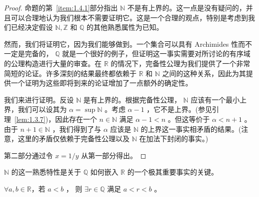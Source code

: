 \begin{proof}
命题的第~\ref{item:1.4.1}部分指出 \(\mathbb{N}\) 不是有上界的。这一点是没有疑问的，并且可以合理地认为我们根本不需要证明它。这是一个合理的观点，特别是考虑到我们已经决定假设 \(\mathbb{N},\mathbb{Z}\) 和 \(\mathbb{Q}\) 的其他熟悉属性为已知。

然而，我们将证明它，因为我们能够做到。一个集合可以具有 Archimides 性而不一定是完备的， \(\mathbb{Q}\) 就是一个很好的例子，但证明这一事实需要对所讨论的有序域的公理构造进行大量的审查。在 \(\mathbb{R}\) 的情况下，完备性公理为我们提供了一个非常简短的论证。许多深刻的结果最终都依赖于 \(\mathbb{R}\) 和 \(\mathbb{N}\) 之间的这种关系，因此为其提供一个证明为这些即将到来的论证增加了一点额外的确定性。

我们来进行证明。反设 \(\mathbb{N}\) 是有上界的。根据完备性公理， \(\mathbb{N}\) 应该有一个最小上界，我们可以设其为 \(\alpha  = \sup \mathbb{N}\) 。考虑 \(\alpha  - 1\) ，它不是上界。(参见引理~\ref{lem:1.3.7})，因此存在一个 \(n \in  \mathbb{N}\) 满足 \(\alpha  - 1 < n\) 。但这等价于 \(\alpha  < n + 1\) 。由于 \(n + 1 \in  \mathbb{N}\) ，我们得到了与 \(\alpha\) 应该是 \(\mathbb{N}\) 的上界这一事实相矛盾的结果。(注意，这里的矛盾仅依赖于完备性公理以及 \(\mathbb{N}\) 在加法下封闭的事实。)

第二部分通过令 \(x = 1/y\) 从第一部分得出。  
\end{proof}

\(\mathbb{N}\) 的这一熟悉特性是关于 \(\mathbb{Q}\) 如何嵌入 \(\mathbb{R}\) 的一个极其重要事实的关键。


\begin{Thm}
  \label{thm:1.4.3}
  $\forall a,b\in \mathbb{R}$，若 \(a < b\) ， 则 \(\exists r\in \mathbb{Q}\) 满足 \(a < r < b\) 。
\end{Thm}

